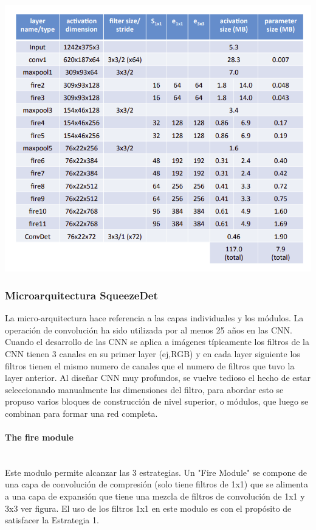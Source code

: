 \begin{center}
    \includegraphics[scale=0.5]{Tesis/Capitulos/03_CAPITULO_1/img/squeezenetmacro.png}
\end{center}

\subsubsection{Microarquitectura SqueezeDet}

La micro-arquitectura hace referencia a las capas individuales y los módulos. La operación de convolución ha sido utilizada por al menos 25 años en las CNN. Cuando el desarrollo de las CNN se aplica a imágenes típicamente los filtros de la CNN tienen 3 canales en su primer layer (ej,RGB) y en cada layer siguiente los filtros tienen el mismo numero de canales que el numero de filtros que tuvo la layer anterior. Al diseñar CNN muy profundos, se vuelve tedioso el hecho de estar seleccionando manualmente las dimensiones del filtro, para abordar esto se propuso varios bloques de construcción de nivel superior, o módulos, que luego se combinan para formar una red completa.

\paragraph{The fire module}\mbox{}\\

Este modulo permite alcanzar las 3 estrategias. Un "Fire Module" se compone de una capa de convolución de compresión (solo tiene filtros de 1x1) que se alimenta a una capa de expansión que tiene una mezcla de filtros de convolución de 1x1 y 3x3 ver figura. El uso de los filtros 1x1 en este modulo es con el propósito de satisfacer la Estrategia 1.

